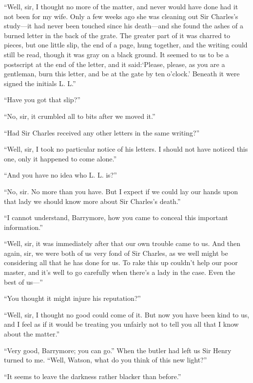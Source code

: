 \documentclass[paper=5.5in:8.5in,BCOR=7mm,twoside,DIV=calc,12pt,usegeometry,openany,chapterprefix,endperiod,headings=big]{scrbook} %
\begin{document}
\enquote{Well, sir, I thought no more of the matter, and never would have done had it not been for my wife. Only a few weeks ago she was cleaning out Sir Charles's study---it had never been touched since his death---and she found the ashes of a burned letter in the back of the grate. The greater part of it was charred to pieces, but one little slip, the end of a page, hung together, and the writing could still be read, though it was gray on a black ground. It seemed to us to be a postscript at the end of the letter, and it said:\enquote{Please, please, as you are a gentleman, burn this letter, and be at the gate by ten o'clock.} Beneath it were signed the initials L. L.}

\enquote{Have you got that slip?}

\enquote{No, sir, it crumbled all to bits after we moved it.}

\enquote{Had Sir Charles received any other letters in the same writing?}

\enquote{Well, sir, I took no particular notice of his letters. I should not have noticed this one, only it happened to come alone.}

\enquote{And you have no idea who L. L. is?}

\enquote{No, sir. No more than you have. But I expect if we could lay our hands upon that lady we should know more about Sir Charles's death.}

\enquote{I cannot understand, Barrymore, how you came to conceal this important information.}

\enquote{Well, sir, it was immediately after that our own trouble came to us. And then again, sir, we were both of us very fond of Sir Charles, as we well might be considering all that he has done for us. To rake this up couldn't help our poor master, and it's well to go carefully when there's a lady in the case. Even the best of us---}

\enquote{You thought it might injure his reputation?}

\enquote{Well, sir, I thought no good could come of it. But now you have been kind to us, and I feel as if it would be treating you unfairly not to tell you all that I know about the matter.}

\enquote{Very good, Barrymore; you can go.} When the butler had left us Sir Henry turned to me. \enquote{Well, Watson, what do you think of this new light?}

\enquote{It seems to leave the darkness rather blacker than before.}
\end{document}
